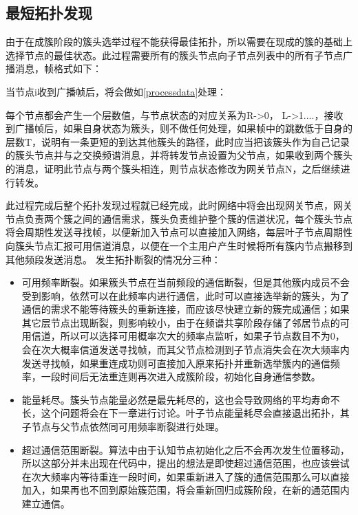 \documentclass[a4paper,AutoFakeBold,oneside,12pt]{book}
\begin{document}
  \subsection{最短拓扑发现}
  由于在成簇阶段的簇头选举过程不能获得最佳拓扑，所以需要在现成的簇的基础上选择节点的最佳状态。此过程需要所有的簇头节点向子节点列表中的所有子节点广播消息，帧格式如下：

  当节点i收到广播帧后，将会做如\ref{processdata}处理：
  
  每个节点都会产生一个层数值，与节点状态的对应关系为R->0， L->1....，接收到广播帧后，如果自身状态为簇头，则不做任何处理，如果帧中的跳数低于自身的层数T，说明有一条更短的到达其他簇头的路径，此时应当把该簇头作为自己记录的簇头节点并与之交换频谱消息，并将转发节点设置为父节点，如果收到两个簇头的消息，证明此节点与两个簇头相连，则节点状态修改为网关节点N，之后继续进行转发。
  
  此过程完成后整个拓扑发现过程就已经完成，此时网络中将会出现网关节点，网关节点负责两个簇之间的通信需求，簇头负责维护整个簇的信道状况，每个簇头节点将会周期性发送寻找帧，以便新加入节点可以直接加入网络，每层叶子节点周期性向簇头节点汇报可用信道消息，以便在一个主用户产生时候将所有簇内节点搬移到其他频段发送消息。
  发生拓扑断裂的情况分三种：
  \begin{itemize}
  \item 可用频率断裂。如果簇头节点在当前频段的通信断裂，但是其他簇内成员不会受到影响，依然可以在此频率内进行通信，此时可以直接选举新的簇头，为了通信的需求不能等待簇头的重新连接，而应该尽快建立新的簇完成通信；如果其它层节点出现断裂，则影响较小，由于在频谱共享阶段存储了邻居节点的可用信道，所以可以选择可用概率次大的频率点监听，如果子节点数目不为0，会在次大概率信道发送寻找帧，而其父节点检测到子节点消失会在次大频率内发送寻找帧，如果重连成功则可直接加入原来拓扑并重新选举簇内的通信频率，一段时间后无法重连则再次进入成簇阶段，初始化自身通信参数。
  \item 能量耗尽。簇头节点能量必然是最先耗尽的，这也会导致网络的平均寿命不长，这个问题将会在下一章进行讨论。叶子节点能量耗尽会直接退出拓扑，其子节点与父节点依然同可用频率断裂进行处理。
  \item 超过通信范围断裂。算法中由于认知节点初始化之后不会再次发生位置移动，所以这部分并未出现在代码中，提出的想法是即使超过通信范围，也应该尝试在次大频率内等待重连一段时间，如果重新进入了簇的通信范围那么可以直接加入，如果再也不回到原始簇范围，将会重新回归成簇阶段，在新的通范围内建立通信。
  \end{itemize}
\end{document}
